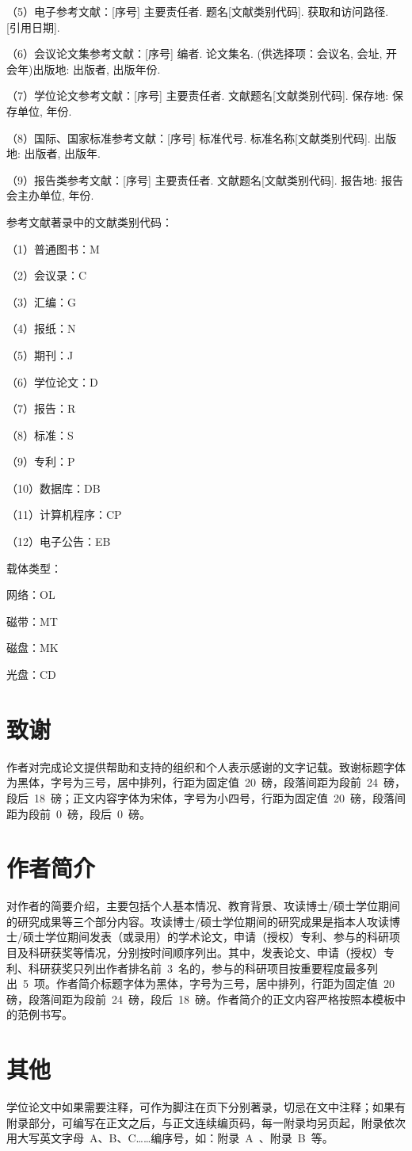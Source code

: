 （5）电子参考文献：[序号] 主要责任者. 题名[文献类别代码]. 获取和访问路径. [引用日期].

（6）会议论文集参考文献：[序号] 编者. 论文集名. (供选择项：会议名, 会址, 开会年)出版地: 出版者, 出版年份.

（7）学位论文参考文献：[序号]  主要责任者. 文献题名[文献类别代码]. 保存地: 保存单位, 年份.

（8）国际、国家标准参考文献：[序号] 标准代号. 标准名称[文献类别代码]. 出版地: 出版者, 出版年.

（9）报告类参考文献：[序号] 主要责任者. 文献题名[文献类别代码]. 报告地: 报告会主办单位, 年份.

参考文献著录中的文献类别代码：

（1）普通图书：M     \par
（2）会议录：C       \par
（3）汇编：G         \par
（4）报纸：N         \par
（5）期刊：J         \par
（6）学位论文：D     \par
（7）报告：R         \par
（8）标准：S         \par
（9）专利：P         \par
（10）数据库：DB     \par
（11）计算机程序：CP \par
（12）电子公告：EB   \par
载体类型：           \par
网络：OL             \par
磁带：MT             \par
磁盘：MK             \par
光盘：CD

\section{致谢}

作者对完成论文提供帮助和支持的组织和个人表示感谢的文字记载。致谢标题字体为黑体，字号为三号，居中排列，行距为固定值~20~磅，段落间距为段前~24~磅，段后~18~磅；正文内容字体为宋体，字号为小四号，行距为固定值~20~磅，段落间距为段前~0~磅，段后~0~磅。

\section{作者简介}

对作者的简要介绍，主要包括个人基本情况、教育背景、攻读博士/硕士学位期间的研究成果等三个部分内容。攻读博士/硕士学位期间的研究成果是指本人攻读博士/硕士学位期间发表（或录用）的学术论文，申请（授权）专利、参与的科研项目及科研获奖等情况，分别按时间顺序列出。其中，发表论文、申请（授权）专利、科研获奖只列出作者排名前~3~名的，参与的科研项目按重要程度最多列出~5~项。作者简介标题字体为黑体，字号为三号，居中排列，行距为固定值~20~ 磅，段落间距为段前~24~磅，段后~18~磅。作者简介的正文内容严格按照本模板中的范例书写。

\section{其他}

学位论文中如果需要注释，可作为脚注在页下分别著录，切忌在文中注释；如果有附录部分，可编写在正文之后，与正文连续编页码，每一附录均另页起，附录依次用大写英文字母~A、B、C……编序号，如：附录~A~、附录~B~等。
